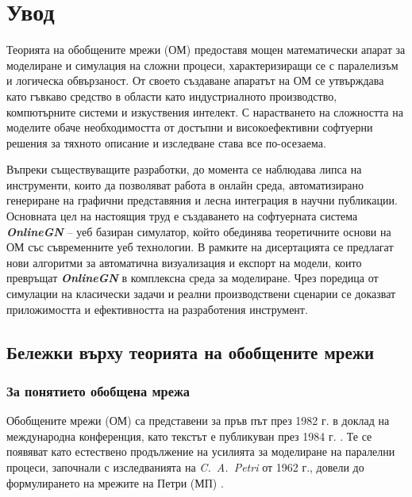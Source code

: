 \clearpage
{}
{}

\section*{Увод}

\hspace*{2.5em} Теорията на обобщените мрежи (ОМ) предоставя мощен математически апарат за моделиране и симулация на сложни процеси, характеризиращи се с паралелизъм и логическа обвързаност. От своето създаване апаратът на ОМ се утвърждава като гъвкаво средство в области като индустриалното производство, компютърните системи и изкуствения интелект. С нарастването на сложността на моделите обаче необходимостта от достъпни и високоефективни софтуерни решения за тяхното описание и изследване става все по-осезаема.

Въпреки съществуващите разработки, до момента се наблюдава липса на инструменти, които да позволяват работа в онлайн среда, автоматизирано генериране на графични представяния и лесна интеграция в научни публикации. Основната цел на настоящия труд е създаването на софтуерната система \textbf{\textit{OnlineGN}} – уеб базиран симулатор, който обединява теоретичните основи на ОМ със съвременните уеб технологии. В рамките на дисертацията се предлагат нови алгоритми за автоматична визуализация и експорт на модели, които превръщат \textbf{\textit{OnlineGN}} в комплексна среда за моделиране. Чрез поредица от симулации на класически задачи и реални производствени сценарии се доказват приложимостта и ефективността на разработения инструмент.



\subsection{Бележки върху теорията на обобщените мрежи}
\subsubsection{За понятието обобщена мрежа}

\hspace*{2.5em}
Обобщените мрежи (ОМ) са представени за пръв път през 1982 г. в доклад на международна конференция, като текстът е публикуван през 1984 г. \cite{DIS-XY20}. Те се появяват като естествено продължение на усилията за моделиране на паралелни процеси, започнали с изследванията на \textit{C.~A.~Petri} от 1962 г., довели до формулирането на мрежите на Петри (МП) \cite{DIS-XY1}.

